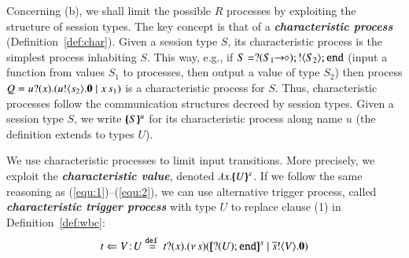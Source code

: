 
Concerning (b), we shall limit the possible $R$ processes by
exploiting the structure of session types.
The key concept is that of a {\bf \emph{characteristic process}} 
(Definition~\ref{def:char}). 
Given a session type $S$, its characteristic process is the 
simplest process inhabiting $S$. 
This way, e.g., if $S = ? (S_1\!\! \rightarrow\!\! \diamond) ; ! \langle S_2 \rangle ; \mathtt{end}$
(input a function from values $S_1$ to processes, then output a value of type $S_2$)
then process $Q = u ? (x) . (u ! \langle s_2 \rangle . \mathbf{0} \;|\; x\, {s_1})$
is a characteristic process for $S$.
Thus, characteristic processes follow the communication structures decreed by session types.
Given a session type $S$, we write $[\!\!(S)\!\!]^{u} $ for its characteristic process along name $u$ (the definition
extends to types $U$).

We use characteristic processes to limit input transitions.
More precisely, we exploit  the
{\bf\em characteristic value}, denoted $\lambda x.[\!\!(U)\!\!]^{x}$. %
If we follow the same reasoning as (\ref{equ:1})--(\ref{equ:2}), 
we can use alternative trigger process, called
{\bf\em characteristic trigger process} with type 
$U$ to replace clause (1) in Definition~\ref{def:wbc}:
\begin{equation}
	\label{eq:4}
	\ftrigger{t}{V}{U} \defeq \fotrigger{t}{x}{s}{\btinp{U} \tinact}{V}
\end{equation}

